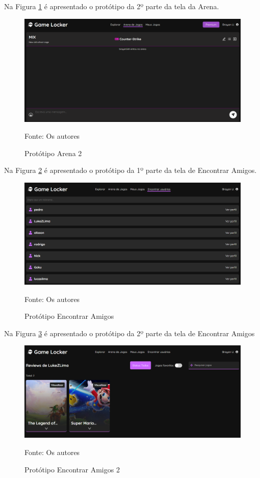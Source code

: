 \begin{apendicesenv}
Na Figura \ref{prototipoArena2} é apresentado o protótipo da 2º parte da tela da Arena.

\begin{figure}[H]
	\centering
	\includegraphics[scale=0.45]{./imagens/PrototipoArena2.png}
	\caption{Protótipo Arena 2}
	Fonte: Os autores
    \label{prototipoArena2}
\end{figure}
\pagebreak

Na Figura \ref{prototipoEncontrarAmigos} é apresentado o protótipo da 1º parte da tela de Encontrar Amigos.

\begin{figure}[H]
	\centering
	\includegraphics[scale=0.45]{./imagens/PrototipoEncontrarAmigos.png}
	\caption{Protótipo Encontrar Amigos}
	Fonte: Os autores
    \label{prototipoEncontrarAmigos}
\end{figure}

Na Figura \ref{prototipoEncontrarAmigos2} é apresentado o protótipo da 2º parte da tela de Encontrar Amigos

\begin{figure}[H]
	\centering
	\includegraphics[scale=0.45]{./imagens/PrototipoEncontrarAmigos2.png}
	\caption{Protótipo Encontrar Amigos 2}
	Fonte: Os autores
    \label{prototipoEncontrarAmigos2}
\end{figure}
\pagebreak


\end{apendicesenv}
